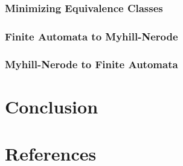 \documentclass[11pt,a4paper,oneside]{book}
\begin{document}
            \paragraph{}

            \subsection{Minimizing Equivalence Classes}

                \paragraph{}
            
            \subsection{Finite Automata to Myhill-Nerode}

                \paragraph{}

            \subsection{Myhill-Nerode to Finite Automata}

                \paragraph{}


    \chapter{Conclusion}

    \chapter{References}

    {}
    
\end{document}
